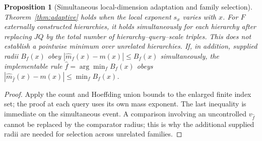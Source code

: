 \documentclass[11pt,a4paper]{article}
\numberwithin{equation}{section}
\newtheorem{proposition}[theorem]{Proposition}
\theoremstyle{definition}\newtheorem{definition}[theorem]{Definition}
\theoremstyle{remark}\newtheorem{remark}[theorem]{Remark}
\begin{document}
\begin{proposition}[Simultaneous local-dimension adaptation and family selection]\label{prop:dimadapt}
Theorem~\ref{thm:adaptive} holds when the local exponent $s_x$ varies with $x$.
For $F$ externally constructed hierarchies, it holds simultaneously for each
hierarchy after replacing $JQ$ by the total number of hierarchy--query--scale
triples. This does not establish a pointwise minimum over unrelated hierarchies.
If, in addition, supplied radii $B_f(x)$ obey
$|\widehat m_f(x)-m(x)|\le B_f(x)$ simultaneously, the implementable rule
$\widehat f=\arg\min_f B_f(x)$ obeys
$|\widehat m_{\widehat f}(x)-m(x)|\le\min_fB_f(x)$.
\end{proposition}
\begin{proof}
Apply the count and Hoeffding union bounds to the enlarged finite index set;
the proof at each query uses its own mass exponent. The last inequality is
immediate on the simultaneous event. A comparison involving an uncontrolled
$v_{\widehat f}$ cannot be replaced by the comparator radius; this is why the
additional supplied radii are needed for selection across unrelated families.
\end{proof}
\end{document}

